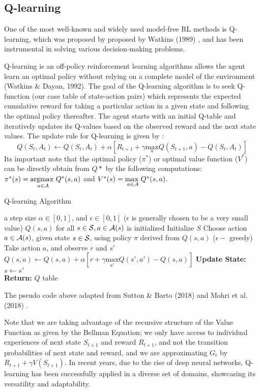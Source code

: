 \subsection{Q-learning}
One of the most well-known and widely used model-free RL methods is Q-learning, which was proposed by proposed by Watkins (1989) \cite{watkins1989}, and has been instrumental in solving various decision-making problems. 

 Q-learning is an off-policy reinforcement learning algorithms allows the agent learn an optimal policy without relying on a complete model of the environment (Watkins \& Dayan, 1992). The goal of the Q-learning algorithm is to seek Q-function (our case table of state-action pairs) which represents the expected cumulative reward for taking a particular action in a given state and following the optimal policy thereafter. The agent starts with an initial Q-table and iteratively updates its Q-values based on the observed reward and the next state values.
The update rule for Q-learning is given by \cite{watkins1992}:
\begin{equation}
    Q(S_t,A_t) \leftarrow
    Q(S_t,A_t) + \alpha
    \left [
    R_{t+1} + \gamma \underset{a}{\text{max}}
    Q(S_{t+1},a) - Q(S_t, A_t)
    \right]
\end{equation}
Its important note that the optimal policy ($\pi^*$) or optimal value function ($V^*$) can be directly obtain from $Q*$ by the following computations: $\pi^*(s) = \underset{a \in \mathcal A}{\text{argmax }} Q^*(s,a)$ and $V^*(s) = \underset{a \in \mathcal A}{\text{max }} Q^*(s,a)$.

\begin{algorithm}
\caption{Q-learning Algorithm}\label{Q-learning}
\begin{algorithmic}
\Require a step size  $\alpha \in [0,1]$, and $\epsilon \in [0,1]$ ($\epsilon$ is generally chosen to be a very small value)
\Ensure $Q(s,a)$ for all $s \in \mathcal{S}, a \in \mathcal A(s)$ is initialized
\State Initialize $S$
    \State Choose action $a \in \mathcal A(s)$, given state $s \in \mathcal{S}$, using policy $\pi$ derived from $Q(s,a)$ 
    \State ($\epsilon-$ greedy)
    \State Take action  $a$, and observe $r$ and $s'$
    \State $Q(s,a) \leftarrow
    Q(s,a) + \alpha
    \left [
    r + \gamma \underset{a'}{\text{max}}
    Q(s',a') - Q(s, a)
    \right]$
    \State \textbf{Update State:} $s \leftarrow s'$
    \EndFor {} \\
    \textbf{Return:} $Q$ table 
\end{algorithmic}
\end{algorithm}
The pseudo code above adapted from Sutton \& Barto (2018) \cite{RL} and Mohri et al. (2018) \cite{mohri2018}.

Note that we are taking advantage of the recursive structure of the Value Function as given by the Bellman Equation; we only have access to individual experiences of next state $S_{t+1}$ and reward $R_{t+1}$, and not the transition probabilities of next state and  reward, and we are approximating $G_t$ by $R_{t+1} + \gamma V(S_{t+1})$. 
In recent years, due to the rise of deep neural networks, Q-learning has been successfully applied in a diverse set of domains, showcasing its versatility and adaptability. 
